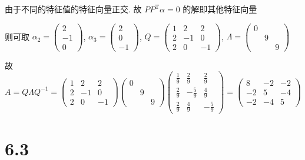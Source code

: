 		 由于不同的特征值的特征向量正交. 故 \( PP^{\mathrm{T}}\alpha = 0 \) 的解即其他特征向量

		 则可取 \( \alpha_{2} = \begin{pmatrix}
			 2  \\
			 -1 \\
			 0
		 \end{pmatrix} \), \( \alpha_{3} = \begin{pmatrix}
			 2 \\
			 0 \\
			 -1
		 \end{pmatrix} \), \( Q = \begin{pmatrix}
			 1 & 2  & 2  \\
			 2 & -1 & 0  \\
			 2 & 0  & -1
		 \end{pmatrix} \), \( \Lambda = \begin{pmatrix}
			 0 &   &   \\
			   & 9 &   \\
			   &   & 9
		 \end{pmatrix} \)

		 故 \( A = Q\Lambda Q^{-1} = \begin{pmatrix}
			 1 & 2  & 2  \\
			 2 & -1 & 0  \\
			 2 & 0  & -1
		 \end{pmatrix}\begin{pmatrix}
			 0 &   &   \\
			   & 9 &   \\
			   &   & 9
		 \end{pmatrix}\begin{pmatrix}
			 \frac{1}{9} & \frac{2}{9}  & \frac{2}{9}  \\
			 \frac{2}{9} & -\frac{5}{9} & \frac{4}{9}  \\
			 \frac{2}{9} & \frac{4}{9}  & -\frac{5}{9}
		 \end{pmatrix} = \begin{pmatrix}
			 8  & -2 & -2 \\
			 -2 & 5  & -4 \\
			 -2 & -4 & 5
		 \end{pmatrix} \)


\section{6.3}

 \subsection{} %


